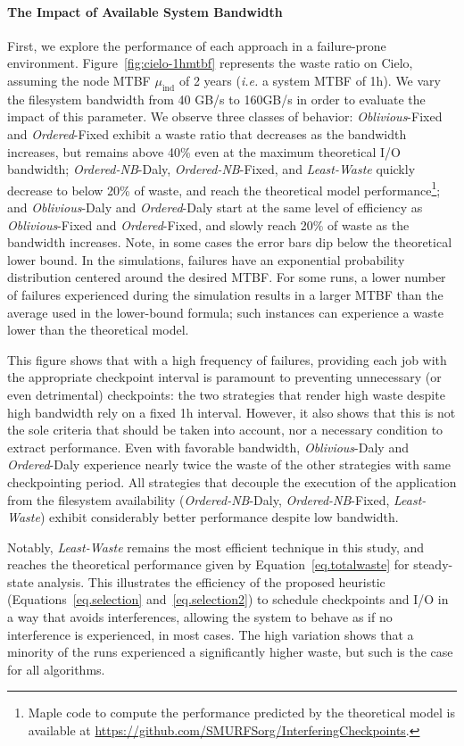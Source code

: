 \documentclass[two]{article}
\newcommand{\ie}[0]{\emph{i.e.}\xspace}
\newcommand{\muind}{\mu_{\text{ind}}}
\newcommand{\nocoop}{\emph{Oblivious}\xspace}
\newcommand{\fifoblock}{\emph{Ordered}\xspace}
\newcommand{\fifononblock}{\emph{Ordered-NB}\xspace}
\newcommand{\leastwaste}{\emph{Least-Waste}\xspace}
\def\propfixed{\nocoop-Fixed\xspace}
\def\propdaly{\nocoop-Daly\xspace}
\def\bfifofixed{\fifoblock-Fixed\xspace}
\def\bfifodaly{\fifoblock-Daly\xspace}
\def\fifofixed{\fifononblock-Fixed\xspace}
\def\fifodaly{\fifononblock-Daly\xspace}
\def\cooperative{\leastwaste}
\begin{document}
\paragraph{The Impact of Available System Bandwidth}
First, we explore the performance of each approach in a failure-prone
environment. Figure~\ref{fig:cielo-1hmtbf} represents the waste ratio
on Cielo, assuming the node MTBF $\muind$ of 2 years (\ie a system
MTBF of 1h). We vary the filesystem bandwidth from 40 GB/s to 160GB/s
in order to evaluate the impact of this parameter. We observe three
classes of behavior: \propfixed and \bfifofixed exhibit a waste ratio
that decreases as the bandwidth increases, but remains above 40\% even
at the maximum theoretical I/O bandwidth; \fifodaly, \fifofixed, and
\cooperative quickly decrease to below 20\% of waste, and reach
the theoretical model performance\footnote{Maple code to compute the
  performance predicted by the theoretical model is available at
  \url{https://github.com/SMURFSorg/InterferingCheckpoints}.};
%
and \propdaly and \bfifodaly start at the same level of efficiency as
\propfixed and \bfifofixed, and slowly reach 20\% of waste as the bandwidth
increases.
%
Note, in some cases the error bars dip below the theoretical
lower bound. In the simulations, failures have an exponential probability
distribution centered around the desired MTBF. For some runs, a lower
number of failures experienced during the simulation results in a larger
MTBF than the average used in the lower-bound formula; such instances
can experience a waste lower than the theoretical model.

This figure shows that with a high frequency of failures, providing each job
with the appropriate checkpoint interval is paramount to preventing unnecessary
(or even detrimental) checkpoints: the two strategies that render high waste
despite high bandwidth rely on a fixed 1h interval. However, it also shows that
this is not the sole criteria that should be taken into account, nor a
necessary condition to extract performance. Even with favorable bandwidth,
\propdaly and \bfifodaly experience nearly twice the waste of the other
strategies with same checkpointing period. All strategies that decouple the
execution of the application from the filesystem availability (\fifodaly,
\fifofixed, \cooperative) exhibit considerably better performance despite low
bandwidth.

Notably, \cooperative remains the most efficient technique in this study, and
reaches the theoretical performance given by Equation~\eqref{eq.totalwaste} for
steady-state analysis. This illustrates the efficiency of the proposed
heuristic (Equations~\eqref{eq.selection} and~\eqref{eq.selection2}) to
schedule checkpoints and I/O in a way that avoids interferences, allowing the
system to behave as if no interference is experienced, in most cases. The high
variation shows that a minority of the runs experienced a significantly higher
waste, but such is the case for all algorithms.
\end{document}
